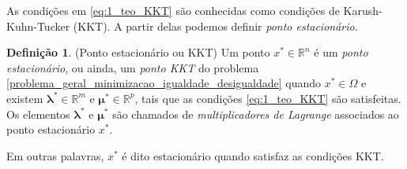 \documentclass[12pt,a4paper]{scrartcl}
\def\RR{\mathds{R}}
\theoremstyle{definition}%
\newtheorem{defi}{Definição}
\begin{document}
As condições em \eqref{eq:1_teo_KKT} são conhecidas como condições de Karush-Kuhn-Tucker (KKT). A partir delas podemos definir \emph{ponto estacionário}.

\begin{defi}(Ponto estacionário ou KKT) \label{defi:ponto_estacionario_KKT}
Um ponto $x^{*} \in \RR^{n} $ é um \emph{ponto estacionário}, ou ainda, um \emph{ponto KKT} do problema \eqref{problema_geral_minimizacao_igualdade_desigualdade} quando $x^{*} \in \Omega$ e existem $\boldsymbol{\lambda}^{*} \in \RR^{m}$ e $\boldsymbol{\mu}^{*} \in \RR^{p}$, tais que as condições \eqref{eq:1_teo_KKT} são satisfeitas. Os elementos $\boldsymbol{\lambda}^{*}$ e $\boldsymbol{\mu}^{*}$ são chamados de \emph{multiplicadores de Lagrange} associados ao ponto estacionário $x^{*}$.
\end{defi}
Em outras palavras, $x^{*}$ é dito estacionário quando satisfaz as condições KKT. 



\end{document}
